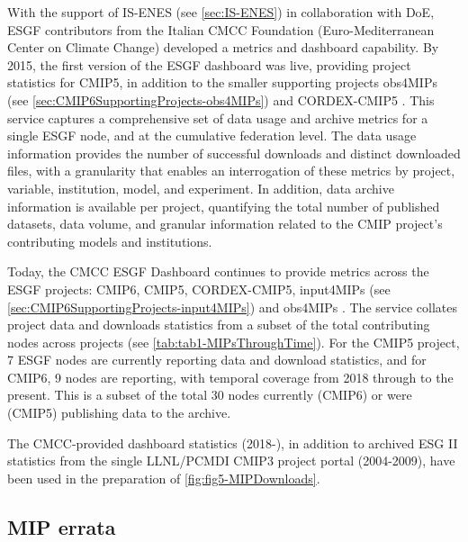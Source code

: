 \documentclass[manuscript]{copernicus}
\newcommand{\mycomment}[1]{}
\def\cred#1{{\color{red}#1}}
\begin{document}
With the support of IS-ENES (see \autoref{sec:IS-ENES}) in collaboration with DoE, ESGF contributors from the Italian CMCC Foundation (Euro-Mediterranean Center on Climate Change) developed a metrics and dashboard capability. By 2015, the first version of the ESGF dashboard was live, providing project statistics for CMIP5, in addition to the smaller supporting projects obs4MIPs (see \autoref{sec:CMIP6SupportingProjects-obs4MIPs}) and CORDEX-CMIP5 \citep{williams_5th_2016}. This service captures a comprehensive set of data usage and archive metrics for a single ESGF node, and at the cumulative federation level. The data usage information provides the number of successful downloads and distinct downloaded files, with a granularity that enables an interrogation of these metrics by project, variable, institution, model, and experiment. In addition, data archive information is available per project, quantifying the total number of published datasets, data volume, and granular information related to the CMIP project's contributing models and institutions.

Today, the CMCC ESGF Dashboard continues to provide metrics across the ESGF projects: CMIP6, CMIP5, CORDEX-CMIP5, input4MIPs (see \autoref{sec:CMIP6SupportingProjects-input4MIPs}) and obs4MIPs \citep{fiore_climate_2019}. The service collates project data and downloads statistics from a subset of the total contributing nodes across projects (see \autoref{tab:tab1-MIPsThroughTime}). For the CMIP5 project, 7 ESGF nodes are currently reporting data and download statistics, and for CMIP6, 9 nodes are reporting, with temporal coverage from 2018 through to the present. This is a subset of the total 30 nodes currently (CMIP6) or were (CMIP5) publishing data to the archive.

The CMCC-provided dashboard statistics (2018-), in addition to archived ESG II statistics from the single LLNL/PCMDI CMIP3 project portal (2004-2009), have been used in the preparation of \autoref{fig:fig5-MIPDownloads}.

\mycomment{
Imperfect:
CMIP3, single node, single report, 2004-2008
CMIP5, 30 nodes, 7 reporting statistics (all CMIP6 data node), 2018-present (missing 2010-2015, 2015-2018)
CMIP6, 30 nodes, 9 reporting statistics, 2018-present
Number of downloads (how time split across files matters), or per GB downloads
}


\subsection{MIP errata}
\label{sec:CMIPErrata}
\end{document}
